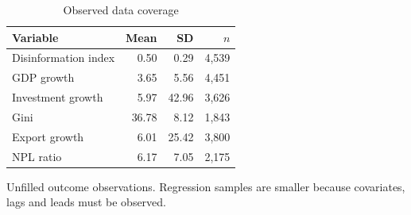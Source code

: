 \begin{table}[!htbp]
\centering\small
\caption{Observed data coverage}\label{tab:summary}
\begin{tabular}{lrrr}\toprule
Variable & Mean & SD & $n$ \\
\midrule
Disinformation index & 0.50 & 0.29 & 4,539 \\
GDP growth & 3.65 & 5.56 & 4,451 \\
Investment growth & 5.97 & 42.96 & 3,626 \\
Gini & 36.78 & 8.12 & 1,843 \\
Export growth & 6.01 & 25.42 & 3,800 \\
NPL ratio & 6.17 & 7.05 & 2,175 \\
\bottomrule\end{tabular}
\par\smallskip\begin{minipage}{0.98\linewidth}\footnotesize Unfilled outcome observations. Regression samples are smaller because covariates, lags and leads must be observed.\end{minipage}
\end{table}
